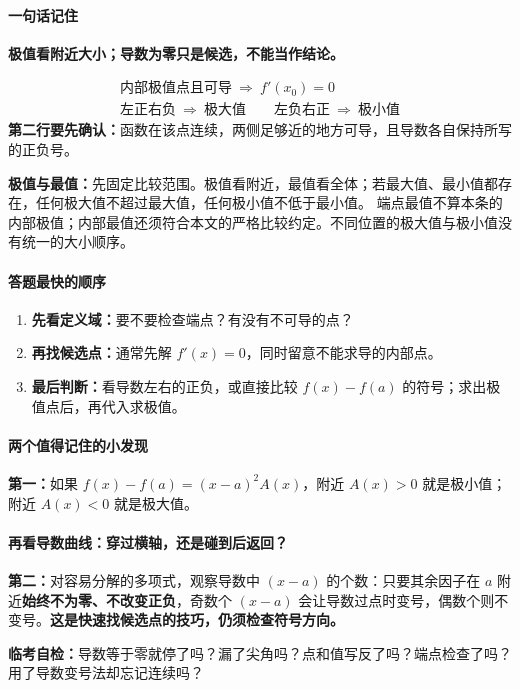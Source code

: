 \clearpage
\begin{summarybox}
\paragraph{一句话记住}
\textbf{极值看附近大小；导数为零只是候选，不能当作结论。}

\[
\boxed{\begin{array}{c}
\text{内部极值点且可导}\ \Longrightarrow\ f'(x_0)=0\\[2pt]
\text{左正右负}\ \Longrightarrow\ \text{极大值}\qquad
\text{左负右正}\ \Longrightarrow\ \text{极小值}
\end{array}}
\]
\textbf{第二行要先确认：}函数在该点连续，两侧足够近的地方可导，且导数各自保持所写的正负号。

\textbf{极值与最值：}先固定比较范围。极值看附近，最值看全体；若最大值、最小值都存在，任何极大值不超过最大值，任何极小值不低于最小值。
端点最值不算本条的内部极值；内部最值还须符合本文的严格比较约定。不同位置的极大值与极小值没有统一的大小顺序。

\paragraph{答题最快的顺序}
\begin{enumerate}
\item \textbf{先看定义域：}要不要检查端点？有没有不可导的点？
\item \textbf{再找候选点：}通常先解 $f'(x)=0$，同时留意不能求导的内部点。
\item \textbf{最后判断：}看导数左右的正负，或直接比较 $f(x)-f(a)$ 的符号；求出极值点后，再代入求极值。
\end{enumerate}

\paragraph{两个值得记住的小发现}
\textbf{第一：}如果 $f(x)-f(a)=(x-a)^2A(x)$，附近 $A(x)>0$ 就是极小值；附近 $A(x)<0$ 就是极大值。
\end{summarybox}
\clearpage
\begin{summarybox}
\paragraph{再看导数曲线：穿过横轴，还是碰到后返回？}

\begin{center}\end{center}
\textbf{第二：}对容易分解的多项式，观察导数中 $(x-a)$ 的个数：只要其余因子在 $a$ 附近\textbf{始终不为零、不改变正负}，奇数个 $(x-a)$ 会让导数过点时变号，偶数个则不变号。\textbf{这是快速找候选点的技巧，仍须检查符号方向。}

\textbf{临考自检：}导数等于零就停了吗？漏了尖角吗？点和值写反了吗？端点检查了吗？用了导数变号法却忘记连续吗？
\end{summarybox}

